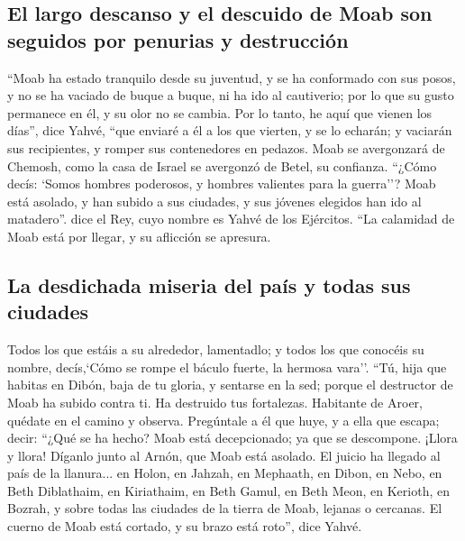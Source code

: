 \hypertarget{el-largo-descanso-y-el-descuido-de-moab-son-seguidos-por-penurias-y-destrucciuxf3n}{%
\subsection{El largo descanso y el descuido de Moab son seguidos por
penurias y
destrucción}\label{el-largo-descanso-y-el-descuido-de-moab-son-seguidos-por-penurias-y-destrucciuxf3n}}

 ``Moab ha estado tranquilo desde su juventud, y se ha
conformado con sus posos, y no se ha vaciado de buque a buque, ni ha ido
al cautiverio; por lo que su gusto permanece en él, y su olor no se
cambia.  Por lo tanto, he aquí que vienen los días'',
dice Yahvé, ``que enviaré a él a los que vierten, y se lo echarán; y
vaciarán sus recipientes, y romper sus contenedores en pedazos.
 Moab se avergonzará de Chemosh, como la casa de Israel
se avergonzó de Betel, su confianza.  ``¿Cómo decís:
`Somos hombres poderosos, y hombres valientes para la guerra''?
 Moab está asolado, y han subido a sus ciudades, y sus
jóvenes elegidos han ido al matadero''. dice el Rey, cuyo nombre es
Yahvé de los Ejércitos.  ``La calamidad de Moab está por
llegar, y su aflicción se apresura.

\hypertarget{la-desdichada-miseria-del-pauxeds-y-todas-sus-ciudades}{%
\subsection{La desdichada miseria del país y todas sus
ciudades}\label{la-desdichada-miseria-del-pauxeds-y-todas-sus-ciudades}}

 Todos los que estáis a su alrededor, lamentadlo; y todos
los que conocéis su nombre, decís,`Cómo se rompe el báculo fuerte, la
hermosa vara''.  ``Tú, hija que habitas en Dibón, baja de
tu gloria, y sentarse en la sed; porque el destructor de Moab ha subido
contra ti. Ha destruido tus fortalezas.  Habitante de
Aroer, quédate en el camino y observa. Pregúntale a él que huye, y a
ella que escapa; decir: ``¿Qué se ha hecho?  Moab está
decepcionado; ya que se descompone. ¡Llora y llora! Díganlo junto al
Arnón, que Moab está asolado.  El juicio ha llegado al
país de la llanura... en Holon, en Jahzah, en Mephaath, 
en Dibon, en Nebo, en Beth Diblathaim,  en Kiriathaim, en
Beth Gamul, en Beth Meon,  en Kerioth, en Bozrah, y sobre
todas las ciudades de la tierra de Moab, lejanas o cercanas.
 El cuerno de Moab está cortado, y su brazo está roto'',
dice Yahvé.

